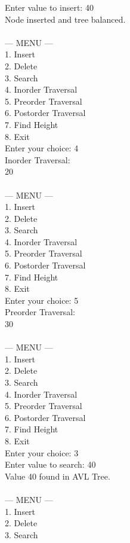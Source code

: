 \documentclass[12pt,a4paper]{article}
\begin{document}
\begin{tcolorbox}[terminalstyle, title=Sample Output]
{Enter value to insert: 40\\
Node inserted and tree balanced.\\
\\
--- MENU ---\\
1. Insert\\
2. Delete\\
3. Search\\
4. Inorder Traversal\\
5. Preorder Traversal\\
6. Postorder Traversal\\
7. Find Height\\
8. Exit\\
Enter your choice: 4\\
Inorder Traversal:\\
20  \\
\\
--- MENU ---\\
1. Insert\\
2. Delete\\
3. Search\\
4. Inorder Traversal\\
5. Preorder Traversal\\
6. Postorder Traversal\\
7. Find Height\\
8. Exit\\
Enter your choice: 5\\
Preorder Traversal:\\
30  \\
\\
--- MENU ---\\
1. Insert\\
2. Delete\\
3. Search\\
4. Inorder Traversal\\
5. Preorder Traversal\\
6. Postorder Traversal\\
7. Find Height\\
8. Exit\\
Enter your choice: 3\\
Enter value to search: 40\\
Value 40 found in AVL Tree.\\
\\
--- MENU ---\\
1. Insert\\
2. Delete\\
3. Search\\
}
\end{tcolorbox}
\end{document}
